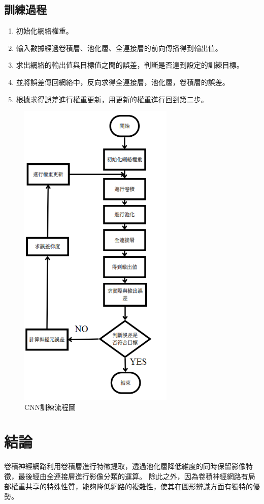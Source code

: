 \subsection{訓練過程}
\begin{enumerate}
	\item
	      初始化網絡權重。
	\item
	      輸入數據經過卷積層、池化層、全連接層的前向傳播得到輸出值。
	\item
	      求出網絡的輸出值與目標值之間的誤差，判斷是否達到設定的訓練目標。
	\item
	      並將誤差傳回網絡中，反向求得全連接層，池化層，卷積層的誤差。
	\item
	      根據求得誤差進行權重更新，用更新的權重進行回到第二步。
\end{enumerate}
\begin{figure}[H]
	\centerline{\includegraphics[height=15cm]{pic/CNNp.PNG}}
	\caption{CNN訓練流程圖}
	\label{fig:CNNTrainningFlowChart}
\end{figure}

\newpage
\section{結論}
卷積神經網路利用卷積層進行特徵提取，透過池化層降低維度的同時保留影像特徵，最後經由全連接層進行影像分類的運算。
除此之外，因為卷積神經網路有局部權重共享的特殊性質，能夠降低網路的複雜性，使其在圖形辨識方面有獨特的優勢。

